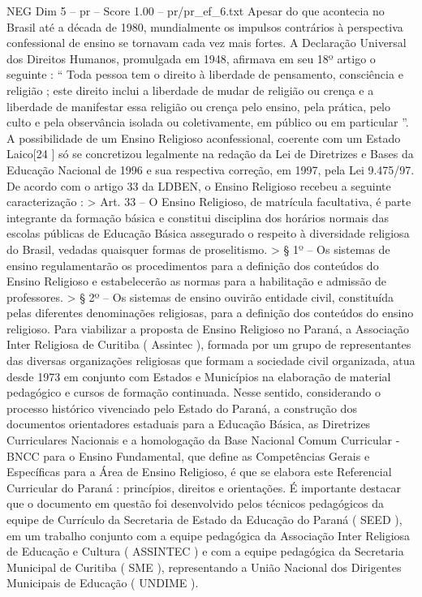 \begin{textsample}{NEG Dim 5 – pr – Score 1.00 – pr/pr\_ef\_6.txt}
Apesar do que acontecia no Brasil até a década de 1980, mundialmente os impulsos contrários à perspectiva confessional de ensino se tornavam cada vez mais fortes.
A Declaração Universal dos Direitos Humanos, promulgada em 1948, afirmava em seu 18º artigo o seguinte : “ Toda pessoa tem o direito à liberdade de pensamento, consciência e religião ; este direito inclui a liberdade de mudar de religião ou crença e a liberdade de manifestar essa religião ou crença pelo ensino, pela prática, pelo culto e pela observância isolada ou coletivamente, em público ou em particular ”.
A possibilidade de um Ensino Religioso aconfessional, coerente com um Estado Laico[24 ] só se concretizou legalmente na redação da Lei de Diretrizes e Bases da Educação Nacional de 1996 e sua respectiva correção, em 1997, pela Lei 9.475/97.
De acordo com o artigo 33 da LDBEN, o Ensino Religioso recebeu a seguinte caracterização : > Art. 33 – O Ensino Religioso, de matrícula facultativa, é parte integrante da formação básica e constitui disciplina dos horários normais das escolas públicas de Educação Básica assegurado o respeito à diversidade religiosa do Brasil, vedadas quaisquer formas de proselitismo. > § 1º – Os sistemas de ensino regulamentarão os procedimentos para a definição dos conteúdos do Ensino Religioso e estabelecerão as normas para a habilitação e admissão de professores. > § 2º – Os sistemas de ensino ouvirão entidade civil, constituída pelas diferentes denominações religiosas, para a definição dos conteúdos do ensino religioso.
Para viabilizar a proposta de Ensino Religioso no Paraná, a Associação Inter Religiosa de Curitiba ( Assintec ), formada por um grupo de representantes das diversas organizações religiosas que formam a sociedade civil organizada, atua desde 1973 em conjunto com Estados e Municípios na elaboração de material pedagógico e cursos de formação continuada.
Nesse sentido, considerando o processo histórico vivenciado pelo Estado do Paraná, a construção dos documentos orientadores estaduais para a Educação Básica, as Diretrizes Curriculares Nacionais e a homologação da Base Nacional Comum Curricular - BNCC para o Ensino Fundamental, que define as Competências Gerais e Específicas para a Área de Ensino Religioso, é que se elabora este Referencial Curricular do Paraná : princípios, direitos e orientações.
É importante destacar que o documento em questão foi desenvolvido pelos técnicos pedagógicos da equipe de Currículo da Secretaria de Estado da Educação do Paraná ( SEED ), em um trabalho conjunto com a equipe pedagógica da Associação Inter Religiosa de Educação e Cultura ( ASSINTEC ) e com a equipe pedagógica da Secretaria Municipal de Curitiba ( SME ), representando a União Nacional dos Dirigentes Municipais de Educação ( UNDIME ).

\end{textsample}
